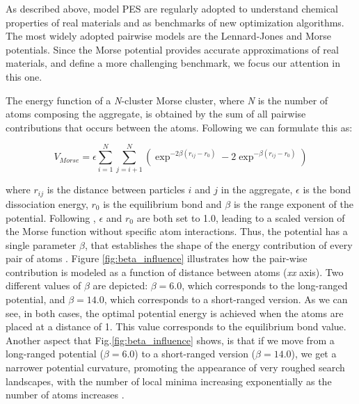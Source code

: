 	As described above, model PES are regularly adopted to understand chemical properties of real materials and as benchmarks of new optimization algorithms. The most widely adopted pairwise models are the Lennard-Jones and Morse potentials. Since the Morse potential provides accurate approximations of real materials, and define a more challenging benchmark, we focus our attention in this one.

	The energy function of a \emph{N}-cluster Morse cluster, where \emph{N} is the number of atoms composing the aggregate, is obtained by the sum of all pairwise contributions that occurs between the atoms. Following \cite{doye97, morse29} we can formulate this as:
	
	\begin{equation} 
		\label{eq:morse_potential}
		V_{Morse} = \epsilon \sum_{i=1}^{N}\sum_{j=i+1}^{N} \left ( \exp^{-2\beta(r_{ij}-r_{0})} - 2\exp^{-\beta(r_{ij}-r_{0})} \right)
	\end{equation}


	\noindent where $r_{ij}$ is the distance between particles $i$ and $j$ in the aggregate, $\epsilon$ is the bond dissociation energy, $r_{0}$ is the equilibrium bond and $\beta$ is the range exponent of the potential. Following \cite{doye97}, $\epsilon$ and $r_{0}$ are both set to 1.0, leading to a scaled version of the Morse function without specific atom interactions. Thus, the potential has a single parameter $\beta$, that establishes the shape of the energy contribution of every pair of atoms \cite{doye04}. Figure \ref{fig:beta_influence} illustrates how the pair-wise contribution is modeled as a function of distance between atoms (\emph{xx} axis). Two different values of $\beta$ are depicted: $\beta = 6.0$, which corresponds to the long-ranged potential, and $\beta = 14.0$, which corresponds to a short-ranged version. As we can see, in both cases, the optimal potential energy is achieved when the atoms are placed at a distance of 1. This value corresponds to the equilibrium bond value. Another aspect that Fig.\ref{fig:beta_influence} shows, is that if we move from a long-ranged potential ($\beta = 6.0$) to a short-ranged version ($\beta = 14.0$), we get a narrower potential curvature, promoting the appearance of very roughed search landscapes, with the number of local minima increasing exponentially as the number of atoms increases \cite{doye04}.
	
	
	
	
	
	
	
	
	
